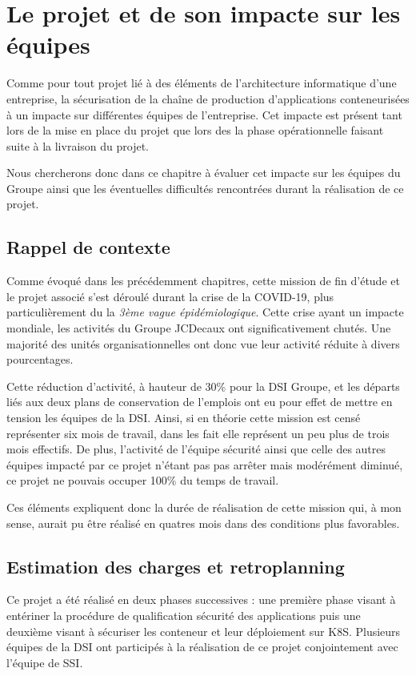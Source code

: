 \chapter{Le projet et de son impacte sur les équipes}
Comme pour tout projet lié à des éléments de l'architecture informatique d'une entreprise, la sécurisation de la chaîne
de production d'applications conteneurisées à un impacte sur différentes équipes de l'entreprise. Cet impacte est présent
tant lors de la mise en place du projet que lors des la phase opérationnelle faisant suite à la livraison du projet.

Nous chercherons donc dans ce chapitre à évaluer cet impacte sur les équipes du Groupe ainsi que les éventuelles 
difficultés rencontrées durant la réalisation de ce projet.

\section{Rappel de contexte}
Comme évoqué dans les précédemment chapitres, cette mission de fin d'étude et le projet associé s'est déroulé
durant la crise de la COVID-19, plus particulièrement du la \textit{3ème vague épidémiologique}. Cette crise ayant un 
impacte mondiale, les activités du Groupe JCDecaux ont significativement chutés. Une majorité des unités organisationnelles
ont donc vue leur activité réduite à divers pourcentages.

Cette réduction d'activité, à hauteur de 30\% pour la \ac{DSI} Groupe, et les départs liés aux deux plans de conservation
de l'emplois ont eu pour effet de mettre en tension les équipes de la \ac{DSI}. Ainsi, si en théorie cette mission est
censé représenter six mois de travail, dans les fait elle représent un peu plus de trois mois effectifs.
\newline De plus, l'activité de l'équipe sécurité ainsi que celle des autres équipes impacté par ce projet n'étant pas 
pas arrêter mais modérément diminué, ce projet ne pouvais occuper 100\% du temps de travail.

Ces éléments expliquent donc la durée de réalisation de cette mission qui, à mon sense, aurait pu être réalisé en 
quatres mois dans des conditions plus favorables.

\section{Estimation des charges et retroplanning}
Ce projet a été réalisé en deux phases successives : une première phase visant à entériner la procédure de qualification 
sécurité des applications puis une deuxième visant à sécuriser les conteneur et leur déploiement sur \ac{K8S}.
\newline Plusieurs équipes de la \ac{DSI} ont participés à la réalisation de ce projet conjointement avec l'équipe de 
\ac{SSI}.

